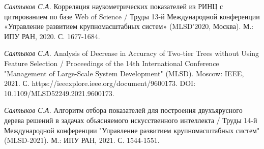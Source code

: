 \documentclass[12pt]{a&t}
\begin{document}
\begin{thebibliography}{10}
\bibitem{}
{\it Салтыков С.А.}
Корреляция наукометрических показателей из РИНЦ с цитированием по базе Web of Science / Труды 13-й Международной конференции «Управление развитием крупномасштабных систем» (MLSD'2020, Москва). М.: ИПУ РАН, 2020. С. 1677-1684.

\bibitem{}
{\it Салтыков С.А.}
Analysis of Decrease in Accuracy of Two-tier Trees without Using Feature Selection / Proceedings of the 14th International Conference "Management of Large-Scale System Development" (MLSD). Moscow: IEEE, 2021. С. https://ieeexplore.ieee.org/document/9600173. DOI: 10.1109/MLSD52249.2021.9600173.

\bibitem{}
{\it Салтыков С.А.}
Алгоритм отбора показателей для построения двухъярусного дерева решений в задачах объясняемого искусственного интеллекта / Труды 14-й Международной конференции "Управление развитием крупномасштабных
систем" (MLSD-2021). М.: ИПУ РАН, 2021. С. 1544-1551.

\end{thebibliography}

\end{document}
